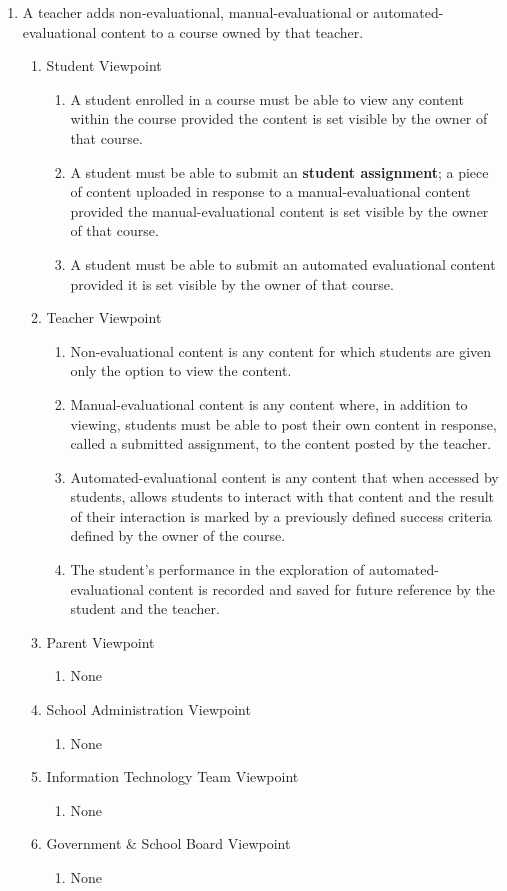 \documentclass[]{article}
\begin{document}
\begin{enumerate}[{BE}1.]
	\item A teacher adds non-evaluational, manual-evaluational or automated-evaluational content to a course owned by that teacher.
	\begin{enumerate}[{VP1}.1]
		\item Student Viewpoint
			\begin{enumerate}
				\item A student enrolled in a course must be able to view any content within the course provided the content is set visible by the owner of that course.
				\item A student must be able to submit an \textbf{student assignment}; a piece of content uploaded in response to a manual-evaluational content provided the manual-evaluational content is set visible by the owner of that course.
				\item A student must be able to submit an automated evaluational content provided it is set visible by the owner of that course.
			\end{enumerate}
		\item Teacher Viewpoint
			\begin{enumerate}
				\item Non-evaluational content is any content for which students are given only the option to view the content.
				\item Manual-evaluational content is any content where, in addition to viewing, students must be able to post their own content in response, called a submitted assignment, to the content posted by the teacher.
				\item Automated-evaluational content is any content that when accessed by students, allows students to interact with that content and the result of their interaction is marked by a previously defined success criteria defined by the owner of the course.
				\item The student's performance in the exploration of automated-evaluational content is recorded and saved for future reference by the student and the teacher.
			\end{enumerate}
		\item Parent Viewpoint
			\begin{enumerate}
				\item None
			\end{enumerate}
		\item School Administration Viewpoint
			\begin{enumerate}
				\item None
			\end{enumerate}
		\item Information Technology Team Viewpoint
			\begin{enumerate}
				\item None
			\end{enumerate}
		\item Government \& School Board Viewpoint
			\begin{enumerate}
				\item None
			\end{enumerate}
	\end{enumerate}


\end{enumerate}
\end{document}
